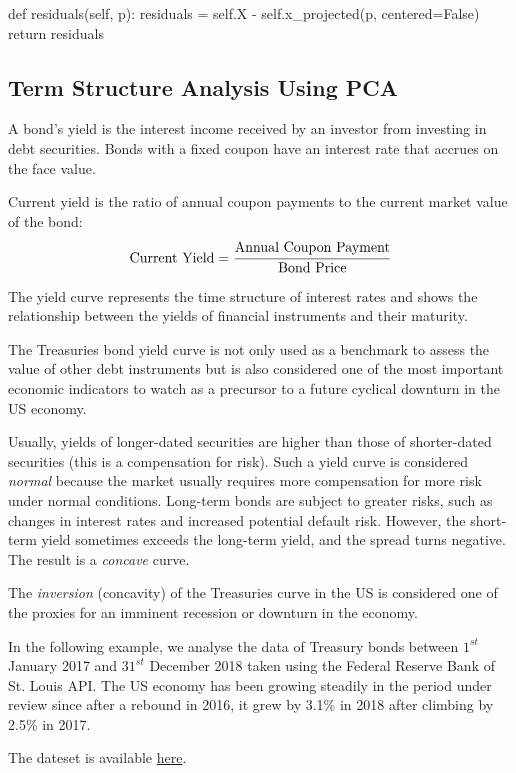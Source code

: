 \begin{enumerate}
\begin{ipython}
    def residuals(self, p):
        residuals = self.X - self.x_projected(p, centered=False)
        return residuals
\end{ipython}

\subsection{Term Structure Analysis Using PCA}

A bond’s yield is the interest income received by an investor from investing in debt securities. Bonds with a fixed coupon have an interest rate that accrues on the face value.

Current yield is the ratio of annual coupon payments to the current market value of the bond:
$$
\text{Current Yield} = \cfrac{\text{Annual Coupon Payment}}{\text{Bond Price}}
$$

The yield curve represents the time structure of interest rates and shows the relationship between the yields of financial instruments and their maturity.

The Treasuries bond yield curve is not only used as a benchmark to assess the value of other debt instruments but is also considered one of the most important economic indicators to watch as a precursor to a future cyclical downturn in the US economy.

Usually, yields of longer-dated securities are higher than those of shorter-dated securities (this is a compensation for risk).
Such a yield curve is considered \emph{normal} because the market usually requires more compensation for more risk under normal conditions. Long-term bonds are subject to greater risks, such as changes in interest rates and increased potential default risk.
However, the short-term yield sometimes exceeds the long-term yield, and the spread turns negative. The result is a \emph{concave} curve.

The \emph{inversion} (concavity) of the Treasuries curve in the US is considered one of the proxies for an imminent recession or downturn in the economy.

In the following example, we analyse the data of Treasury bonds between $1^{st}$ January 2017 and $31^{st}$ December 2018 taken using the Federal Reserve Bank of St. Louis API.
The US economy has been growing steadily in the period under review since after a rebound in 2016, it grew by 3.1\% in 2018 after climbing by 2.5\% in 2017.

The dateset is available \href{https://github.com/matteosan1/finance_course/raw/develop/input_files/DGS_2017_2018.csv"}{here}.


\end{enumerate}
